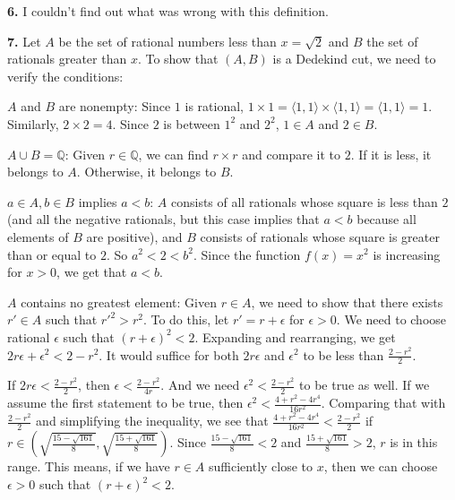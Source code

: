 \documentclass{article}
\begin{document}
\textbf{6.} I couldn't find out what was wrong with this definition.
\newline

\textbf{7.} Let $A$ be the set of rational numbers less than $x = \sqrt{2}$ and $B$ the set of rationals greater than $x$. To show that $(A, B)$ is a Dedekind cut, we need to verify the conditions:
\newline

$A$ and $B$ are nonempty: Since $1$ is rational, $1 \times 1 = \langle 1, 1 \rangle \times \langle 1, 1 \rangle = \langle 1, 1 \rangle = 1$. Similarly, $2 \times 2 = 4$. Since $2$ is between $1^2$ and $2^2$, $1 \in A$ and $2 \in B$.
\newline

$A\cup B = \mathbb{Q}$: Given $r \in \mathbb{Q}$, we can find $r\times r$ and compare it to $2$. If it is less, it belongs to $A$. Otherwise, it belongs to $B$.
\newline

$a \in A, b \in B$ implies $a < b$: $A$ consists of all rationals whose square is less than $2$ (and all the negative rationals, but this case implies that $a < b$ because all elements of $B$ are positive), and $B$ consists of rationals whose square is greater than or equal to $2$. So $a^2 < 2 < b^2$. Since the function $f(x) = x^2$ is increasing for $x > 0$, we get that $a < b$.
\newline

$A$ contains no greatest element: Given $r \in A$, we need to show that there exists $r' \in A$ such that $r'^2 > r^2$. To do this, let $r' = r + \epsilon$ for $\epsilon > 0$. We need to choose rational $\epsilon$ such that $(r + \epsilon)^2 < 2$. Expanding and rearranging, we get $2r\epsilon + \epsilon^2 < 2 - r^2$. It would suffice for both $2r\epsilon$ and $\epsilon^2$ to be less than $\frac{2 - r^2}{2}$.
\newline

If $2r\epsilon < \frac{2 - r^2}{2}$, then $\epsilon < \frac{2 - r^2}{4r}$. And we need $\epsilon^2 < \frac{2 - r^2}{2}$ to be true as well. If we assume the first statement to be true, then $\epsilon^2 < \frac{4 + r^2 - 4r^4}{16r^2}$. Comparing that with $\frac{2 - r^2}{2}$ and simplifying the inequality, we see that $\frac{4 + r^2 - 4r^4}{16r^2} < \frac{2 - r^2}{2}$ if $r \in \left(\sqrt{\frac{15-\sqrt{161}}{8}}, \sqrt{\frac{15+\sqrt{161}}{8}}\right)$. Since $\frac{15-\sqrt{161}}{8} < 2$ and $\frac{15+\sqrt{161}}{8} > 2$, $r$ is in this range. This means, if we have $r \in A$ sufficiently close to $x$, then we can choose $\epsilon > 0$ such that $(r + \epsilon)^2 < 2$.
\newline
\end{document}
